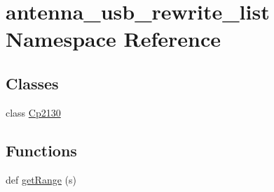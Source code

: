 \hypertarget{namespaceantenna__usb__rewrite__list}{}\section{antenna\+\_\+usb\+\_\+rewrite\+\_\+list Namespace Reference}
\label{namespaceantenna__usb__rewrite__list}
\subsection*{Classes}
\begin{DoxyCompactItemize}
\item 
class \hyperlink{classantenna__usb__rewrite__list_1_1_cp2130}{Cp2130}
\end{DoxyCompactItemize}
\subsection*{Functions}
\begin{DoxyCompactItemize}
\item 
def \hyperlink{namespaceantenna__usb__rewrite__list_a4dfe4beb7b1df6af753add339c06c311}{get\+Range} (s)
\end{DoxyCompactItemize}
